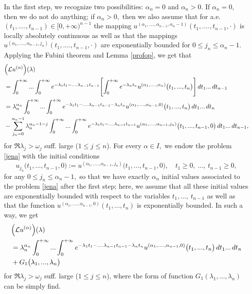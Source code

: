 \documentclass{amsart}
\theoremstyle{definition}
\theoremstyle{remark}
\numberwithin{equation}{section}
\begin{document}
In the first step, we recognize two possibilities: $\alpha_{n}=0$ and $\alpha_{n}>0.$ If $\alpha_{n}=0,$ then we do not do anything; if $\alpha_{n}>0,$ then we also assume
that for a.e. $(t_{1},....,t_{n-1})\in [0,+\infty)^{n-1}$ the mapping $u^{(\alpha_{1},....,\alpha_{n-1},\alpha_{n}-1)}(t_{1},....,t_{n-1},\cdot)$ is locally absolutely continuous as well as that the mappings $u^{(\alpha_{1},....,\alpha_{n-1},j_{n})}(t_{1},....,t_{n-1},\cdot)$ are exponentially bounded for $0\leq j_{n}\leq \alpha_{n}-1.$ Applying the Fubini theorem and Lemma \ref{profop}, we get that{\small
\begin{align*} &
\Bigl({\mathcal L}u^{(\alpha)}\Bigr)(\lambda)
\\&=\int^{+\infty}_{0}... \int^{+\infty}_{0}e^{-\lambda_{1}t_{1}-....\lambda_{n-1}t_{n-1}}\Biggl[\int^{+\infty}_{0}e^{-\lambda_{n}t_{n}}u^{(\alpha_{1},....,\alpha_{n})}\bigl( t_{1},...,t_{n}\bigr) \Biggr]\, dt_{1}...\, dt_{n-1}
\\& =\lambda_{n}^{\alpha_{n}}\int^{+\infty}_{0}... \int^{+\infty}_{0}e^{-\lambda_{1}t_{1}-....\lambda_{n-1}t_{n-1}-\lambda_{n}t_{n}}u^{(\alpha_{1},....,\alpha_{n-1},0)}\bigl( t_{1},...,t_{n}\bigr) \, dt_{1}...\, dt_{n}
\\& -\sum_{j_{n}=0}^{\alpha_{n}-1}\lambda_{n}^{\alpha_{n}-1-j}\int^{+\infty}_{0}... \int^{+\infty}_{0}e^{-\lambda_{1}t_{1}-....\lambda_{n-1}t_{n-1}}u^{(\alpha_{1},....,\alpha_{n-1},j_{n})}\bigl( t_{1},...,t_{n-1},0\bigr)\, dt_{1}...\, dt_{n-1},
\end{align*}}
for $\Re \lambda_{j}>\omega_{j}$ suff. large ($1\leq j\leq n$). For every $\alpha \in I,$ we endow the problem \eqref{jena} with the initial conditions
$$
u_{j_{n}}\bigl( t_{1},...,t_{n-1},0\bigr) := u^{(\alpha_{1},....,\alpha_{n-1},j_{n})}\bigl( t_{1},...,t_{n-1},0\bigr),\quad t_{1}\geq 0,\ ...,\ t_{n-1}\geq 0,
$$
for any $0\leq j_{n}\leq \alpha_{n}-1,$ so that we have exactly $\alpha_{n}$ initial values associated to the problem \eqref{jena} after the first step; here, we assume that all these initial values are exponentially bounded with respect to the variables $t_{1},...,\ t_{n-1}$ as well as that the function $u^{(\alpha_{1},....,\alpha_{n-1},0)}( t_{1},...,t_{n}) $ is exponentially bounded. In such a way, we get
\begin{align*} &
\Bigl({\mathcal L}u^{(\alpha)}\Bigr)(\lambda)
\\&=\lambda_{n}^{\alpha_{n}}\int^{+\infty}_{0}... \int^{+\infty}_{0}e^{-\lambda_{1}t_{1}-....\lambda_{n-1}t_{n-1}-\lambda_{n}t_{n}}u^{(\alpha_{1},....,\alpha_{n-1},0)}\bigl( t_{1},...,t_{n}\bigr) \, dt_{1}...\, dt_{n}
\\&+G_{1}\bigl( \lambda_{1},...,\lambda_{n}\bigr)
\end{align*}
for $\Re \lambda_{j}>\omega_{j}$ suff. large ($1\leq j\leq n$), where the form of function $ G_{1}( \lambda_{1},...,\lambda_{n})$
can be simply find.
\end{document}
